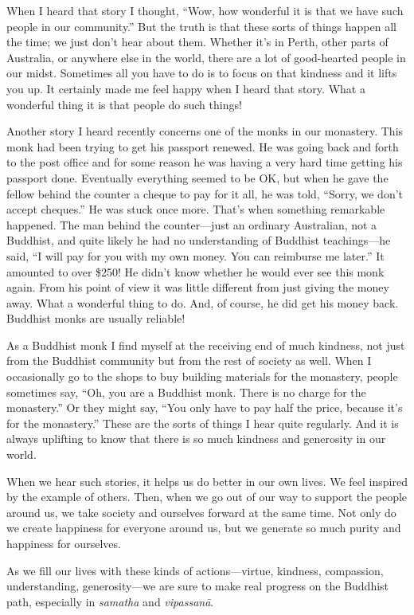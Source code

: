 \documentclass[12pt,openany]{book}
\begin{document}
When I heard that story I thought, “Wow, how wonderful it is that we have such people in our community.” But the truth is that these sorts of things happen all the time; we just don't hear about them. Whether it’s in Perth, other parts of Australia, or anywhere else in the world, there are a lot of good-hearted people in our midst. Sometimes all you have to do is to focus on that kindness and it lifts you up. It certainly made me feel happy when I heard that story. What a wonderful thing it is that people do such things!

Another story I heard recently concerns one of the monks in our monastery. This monk had been trying to get his passport renewed. He was going back and forth to the post office and for some reason he was having a very hard time getting his passport done. Eventually everything seemed to be OK, but when he gave the fellow behind the counter a cheque to pay for it all, he was told, “Sorry, we don’t accept cheques.” He was stuck once more. That’s when something remarkable happened. The man behind the counter—just an ordinary Australian, not a Buddhist, and quite likely he had no understanding of Buddhist teachings—he said, “I will pay for you with my own money. You can reimburse me later.” It amounted to over \$250! He didn’t know whether he would ever see this monk again. From his point of view it was little different from just giving the money away. What a wonderful thing to do. And, of course, he did get his money back. Buddhist monks are usually reliable!

As a Buddhist monk I find myself at the receiving end of much kindness, not just from the Buddhist community but from the rest of society as well. When I occasionally go to the shops to buy building materials for the monastery, people sometimes say, “Oh, you are a Buddhist monk. There is no charge for the monastery.” Or they might say, “You only have to pay half the price, because it's for the monastery.” These are the sorts of things I hear quite regularly. And it is always uplifting to know that there is so much kindness and generosity in our world.

When we hear such stories, it helps us do better in our own lives. We feel inspired by the example of others. Then, when we go out of our way to support the people around us, we take society and ourselves forward at the same time. Not only do we create happiness for everyone around us, but we generate so much purity and happiness for ourselves.

As we fill our lives with these kinds of actions—virtue, kindness, compassion, understanding, generosity—we are sure to make real progress on the Buddhist path, especially in \textit{samatha} and \textit{vipassanā}.
\end{document}
